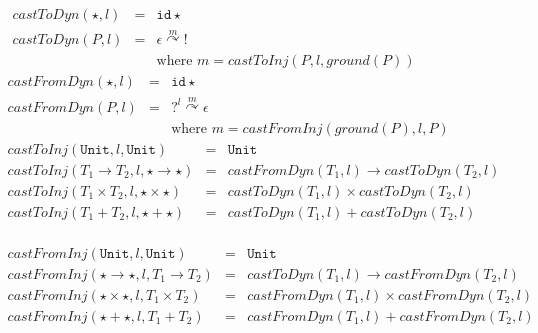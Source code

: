 \documentclass[acmsmall,review]{acmart}\settopmatter{printfolios=true,printccs=false,printacmref=false}
\newcommand{\POOunit}[0]{\mathtt{Unit}}
\newcommand{\hyperCoercionI}[0]{\mathtt{id\star}}
\newcommand{\hyperCoercionC}[3]{#1 \overset{#2}{\curvearrowright} #3}
\begin{document}
\begin{figure}
  \[
  \begin{array}{rclr}
    \mathit{castToDyn}(\star,l) &=& \hyperCoercionI{} \\
    \mathit{castToDyn}(P,l) &=&
      \hyperCoercionC{\epsilon}{m}{!} \\
    && \text{where } m = \mathit{castToInj}(P,l,\mathit{ground}(P)) 
  \end{array}
  \]
  \[
  \begin{array}{rclr}
    \mathit{castFromDyn}(\star,l) &=& \hyperCoercionI{} \\
    \mathit{castFromDyn}(P,l) &=& \hyperCoercionC{?^l}{m}{\epsilon} \\
    && \text{where } m = \mathit{castFromInj}(\mathit{ground}(P),l,P) 
  \end{array}
  \]
  \[
  \begin{array}{rclr}
    \mathit{castToInj}(\POOunit,l,\POOunit) &=& \POOunit \\
    \mathit{castToInj}(T_1 \to T_2,l, \star \to \star) &=&
        \mathit{castFromDyn}(T_1,l) \to \mathit{castToDyn}(T_2,l) \\
    \mathit{castToInj}(T_1 \times T_2,l, \star \times \star) &=&
        \mathit{castToDyn}(T_1,l) \times \mathit{castToDyn}(T_2,l) \\
    \mathit{castToInj}(T_1 + T_2,l, \star + \star) &=&
        \mathit{castToDyn}(T_1,l) + \mathit{castToDyn}(T_2,l) \\
  \end{array}
  \]
  
  \[
  \begin{array}{rclr}
    \mathit{castFromInj}(\POOunit,l,\POOunit) &=& \POOunit \\
    \mathit{castFromInj}(\star \to \star,l, T_1 \to T_2) &=&
        \mathit{castToDyn}(T_1,l) \to \mathit{castFromDyn}(T_2,l) \\
    \mathit{castFromInj}(\star \times \star,l, T_1 \times T_2) &=&
        \mathit{castFromDyn}(T_1,l) \times \mathit{castFromDyn}(T_2,l) \\
    \mathit{castFromInj}(\star + \star,l, T_1 + T_2) &=&
        \mathit{castFromDyn}(T_1,l) + \mathit{castFromDyn}(T_2,l) \\
  \end{array}
  \]


\end{figure}
\end{document}
